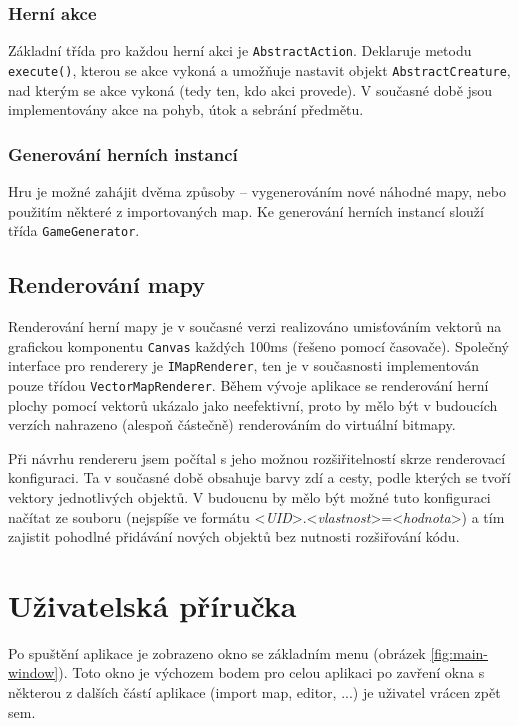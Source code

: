 \documentclass[11pt,a4paper]{scrartcl}
\begin{document}
	\subsubsection{Herní akce}
	Základní třída pro každou herní akci je \verb|AbstractAction|. Deklaruje metodu \verb|execute()|, kterou se akce vykoná a umožňuje nastavit objekt \verb|AbstractCreature|, nad kterým se akce vykoná (tedy ten, kdo akci provede). V současné době jsou implementovány akce na pohyb, útok a sebrání předmětu.
	
	\subsubsection{Generování herních instancí}
	Hru je možné zahájit dvěma způsoby -- vygenerováním nové náhodné mapy, nebo použitím některé z importovaných map. Ke generování herních instancí slouží třída \verb|GameGenerator|.
	
	\subsection{Renderování mapy}
	Renderování herní mapy je v současné verzi realizováno umisťováním vektorů na grafickou komponentu \verb|Canvas| každých 100ms (řešeno pomocí časovače). Společný interface pro renderery je \verb|IMapRenderer|, ten je v současnosti implementován pouze třídou \verb|VectorMapRenderer|. Během vývoje aplikace se renderování herní plochy pomocí vektorů ukázalo jako neefektivní, proto by mělo být v budoucích verzích nahrazeno (alespoň částečně) renderováním do virtuální bitmapy.
	
	Při návrhu rendereru jsem počítal s jeho možnou rozšiřitelností skrze renderovací konfiguraci. Ta v současné době obsahuje barvy zdí a cesty, podle kterých se tvoří vektory jednotlivých objektů. V budoucnu by mělo být možné tuto konfiguraci načítat ze souboru (nejspíše ve formátu \textless\textit{UID}\textgreater.\textless\textit{vlastnost}\textgreater=\textless\textit{hodnota}\textgreater) a tím zajistit pohodlné přidávání nových objektů bez nutnosti rozšiřování kódu.
	
	\section{Uživatelská příručka}
	Po spuštění aplikace je zobrazeno okno se základním menu (obrázek \ref{fig:main-window}). Toto okno je výchozem bodem pro celou aplikaci po zavření okna s některou z dalších částí aplikace (import map, editor, ...) je uživatel vrácen zpět sem.
	
\end{document}
